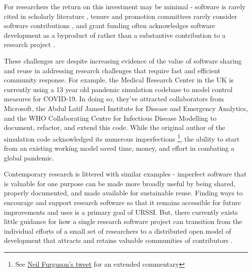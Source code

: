 \documentclass[
]{book}
\begin{document}
For researchers the return on this investment may be minimal - software is rarely cited in scholarly literature \citep{howison2016software, hwang2017software, hsu2019comparing, park2019research}, tenure and promotion committees rarely consider software contributions \citep{moher2018assessing}, and grant funding often acknowledges software development as a byproduct of rather than a substantive contribution to a research project \citep{broman2017recommendations, siepel2019challenges}.

These challenges are despite increasing evidence of the value of software sharing and reuse in addressing research challenges that require fast and efficient community response.
For example, the Medical Research Center in the UK is currently using a 13 year old pandemic simulation codebase to model control measures for COVID-19.
In doing so, they've attracted collaborators from Microsoft, the Abdul Latif Jameel Institute for Disease and Emergency Analytics, and the WHO Collaborating Centre for Infectious Disease Modelling to document, refactor, and extend this code.
While the original author of the simulation code acknowledged its numerous imperfections \footnote{See \href{https://twitter.com/neil_ferguson/status/1241835454707699713}{Neil Furguson's tweet} for an extended commentary}, the ability to start from an existing working model saved time, money, and effort in combating a global pandemic.

Contemporary research is littered with similar examples - imperfect software that is valuable for one purpose can be made more broadly useful by being shared, properly documented, and made available for sustainable reuse.
Finding ways to encourage and support research software so that it remains accessible for future improvements and uses is a primary goal of URSSI.
But, there currently exists little guidance for how a single research software project can transition from the individual efforts of a small set of researchers to a distributed open model of development that attracts and retains valuable communities of contributors \citep{howison2015sustaining}.
\end{document}
